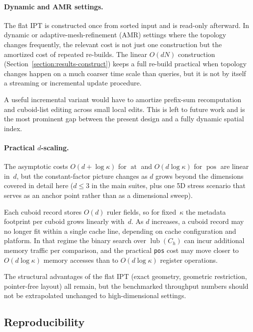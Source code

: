 \documentclass[manuscript,screen,review]{acmart}
\theoremstyle{definition}
\theoremstyle{plain}
\begin{document}
\paragraph{Dynamic and AMR settings.}
The flat IPT is constructed once from sorted input and is read-only
afterward. In dynamic or adaptive-mesh-refinement (AMR) settings where
the topology changes frequently, the relevant cost is not just one
construction but the amortized cost of repeated re-builds. The linear
$O(dN)$ construction (Section~\ref{section:results-construct}) keeps a
full re-build practical when topology changes happen on a much coarser
time scale than queries, but it is not by itself a streaming or
incremental update procedure.

A useful incremental variant would have to amortize prefix-sum
recomputation and cuboid-list editing across
small local edits. This is left to future work and is the most
prominent gap between the present design and a fully dynamic spatial
index.

\paragraph{Practical $d$-scaling.}
The asymptotic costs $O(d+\log\kappa)$ for $\operatorname{at}$ and
$O(d\log\kappa)$ for $\operatorname{pos}$ are linear in~$d$, but the
constant-factor picture changes as $d$ grows beyond the dimensions
covered in detail here ($d\le 3$ in the main suites, plus one 5D
stress scenario that serves as an anchor point rather than as a
dimensional sweep).

Each cuboid record stores $O(d)$ ruler fields, so for fixed~$\kappa$
the metadata footprint per cuboid grows linearly
with~$d$. As $d$ increases, a cuboid record may no longer fit within a
single cache line, depending on cache configuration and platform. In
that regime the binary search over $\operatorname{lub}(C_h)$ can incur
additional memory traffic per comparison, and the practical
\texttt{pos} cost may move closer to $O(d\log\kappa)$ memory accesses
than to $O(d\log\kappa)$ register operations.

The structural advantages of the flat IPT (exact geometry,
geometric restriction,
pointer-free layout) all remain, but the benchmarked throughput
numbers should not be extrapolated unchanged to high-dimensional
settings.

\subsection{Reproducibility}
\label{section:reproducibility}
\end{document}
